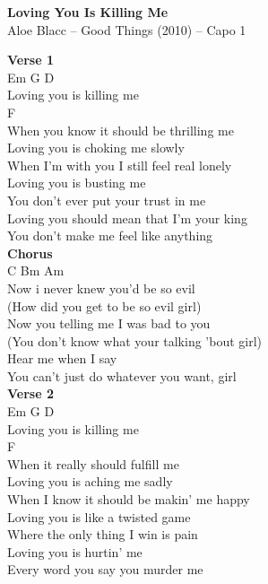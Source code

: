 \documentclass[a4paper]{article}
\begin{document}
    \begin{center}
        \textbf{Loving You Is Killing Me}
        ~\\
        Aloe Blacc -- Good Things (2010)
         -- Capo 1
    \end{center}
    {
        \scriptsize
        \textbf{Verse 1}
        ~\\
        {
            \cutive
            \obeyspaces
Em      G            D
\\
Loving you is killing me
\\
          F
\\
When you know it should be thrilling me
\\
Loving you is choking me slowly
\\
When I'm with you I still feel real lonely
\\
Loving you is busting me
\\
You don't ever put your trust in me
\\
Loving you should mean that I'm your king
\\
You don't make me feel like anything
\\

        }
        \textbf{Chorus}
        ~\\
        {
            \cutive
            \obeyspaces
C          Bm                Am
\\
Now i never knew you'd be so evil
\\
(How did you get to be so evil girl)
\\
Now you telling me I was bad to you
\\
(You don't know what your talking 'bout girl)
\\
Hear me when I say
\\
You can't just do whatever you want, girl
\\

        }
        \textbf{Verse 2}
        ~\\
        {
            \cutive
            \obeyspaces
Em      G             D
\\
Loving you is killing me
\\
           F
\\
When it really should fulfill me
\\
Loving you is aching me sadly
\\
When I know it should be makin' me happy
\\
Loving you is like a twisted game
\\
Where the only thing I win is pain
\\
Loving you is hurtin' me
\\
Every word you say you murder me
\\

}}
\end{document}
